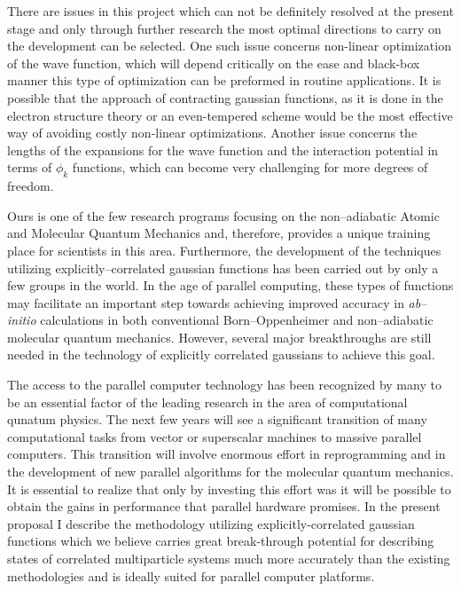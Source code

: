 There are issues in this project which can not be definitely
resolved at the present stage and only through further research 
the most optimal directions to carry on the development can be
selected. One such issue concerns non-linear optimization of the
wave function, which will depend critically on the ease and black-box
manner this type of optimization can be preformed in routine applications.
It is possible that the approach of contracting gaussian functions,
as it is done in the electron structure theory 
or an even-tempered scheme 
would be the most
effective way of avoiding costly non-linear optimizations.
Another issue concerns the lengths of the expansions for the
wave function and the interaction potential in terms of $\phi_k$
functions, which can become very challenging for more degrees
of freedom.



Ours is one of the few research 
programs focusing on the non--adiabatic 
Atomic and Molecular Quantum Mechanics
and, therefore, provides a unique 
training place for scientists in this area.  
Furthermore, the development of the techniques 
utilizing explicitly--correlated gaussian functions
has been carried out by only a few groups in the world.  
In the age of parallel computing, these
types of functions may facilitate an important 
step towards achieving improved accuracy in 
{\it ab--initio} calculations in both conventional 
Born--Oppenheimer and non--adiabatic 
molecular quantum mechanics.
However, several major breakthroughs are still needed 
in the technology of explicitly correlated gaussians
to achieve this goal.


The access to the parallel computer technology 
has been recognized by many to be an
essential factor of the leading research 
in the area of computational qunatum physics.  
The next few years will see a significant 
transition of many computational tasks from
vector or superscalar machines to massive 
parallel computers.  This transition will
involve enormous effort in reprogramming 
and in the development of new
parallel algorithms for the
molecular quantum mechanics.
It is essential to realize that only by investing this
effort was it will be possible to obtain the gains in performance 
that parallel hardware promises.  
In the present proposal I describe the methodology 
utilizing explicitly-correlated gaussian
functions which we believe carries great 
break-through potential for describing 
states of correlated multiparticle systems much more 
accurately than the existing methodologies and is
ideally suited for parallel computer platforms.  



